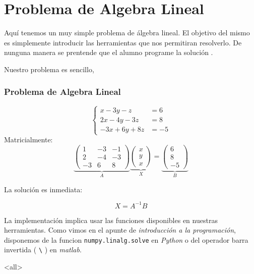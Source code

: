 \section{Problema de Algebra Lineal}


Aquí tenemos un muy simple problema de álgebra lineal. 
El objetivo del mismo es simplemente introducir las herramientas
que nos permitiran resolverlo. De nunguna manera se 
prentende que el alumno programe la solución . 

Nuestro problema es sencillo, 

\mode*

\begin{frame}[label=FrameEquationAlgebraLineal]
  \frametitle<presentation>{Problema de Algebra Lineal}

  \begin{equation}
    \left\{
      \begin{aligned}
	x - 3y -z &= 6 \\
	2 x -4 y -3 z &= 8 \\
	-3 x + 6 y + 8z &= -5
      \end{aligned}
    \right.
  \end{equation}
  Matricialmente:
  \begin{equation}
    \underbrace{
    \begin{pmatrix}
      1 & -3 & -1 \\
      2 & -4 & -3 \\
      -3 & 6 & 8 
    \end{pmatrix}
  }_A
    \underbrace{
    \begin{pmatrix}
      x \\ y \\ x
    \end{pmatrix}
  }_X
    =
    \underbrace{
    \begin{pmatrix}
      6 \\8 \\ -5
    \end{pmatrix}
  }_B
  \end{equation}

  La solución es inmediata:

  \begin{equation}
    X = A^{-1} B
  \end{equation}
\end{frame}


La implementación implica usar las funciones disponibles
en nuestras herramientas. Como vimos en el apunte 
de \emph{introducción a la programación}, disponemos de
la funcion \texttt{numpy.linalg.solve} en \emph{Python}
o del operador barra invertida  ( \texttt{\textbackslash} ) en \emph{matlab}.

\mode*
\mode<all>
